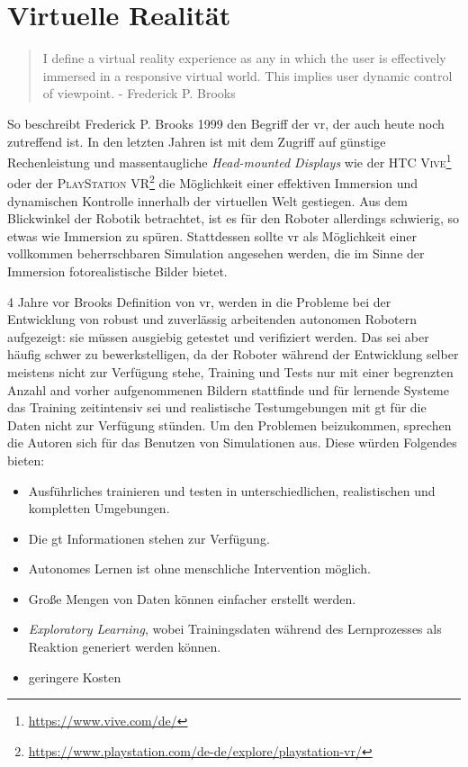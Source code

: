 \section{Virtuelle Realität}

\begin{quote}
\glqq I define a virtual reality experience as any in which the user is effectively immersed in a responsive virtual world. This implies user dynamic control of viewpoint.\grqq \newline
 \hfill - Frederick P. Brooks
\end{quote}
So beschreibt Frederick P. Brooks 1999 \cite{brooks} den Begriff der \gls{vr}, der auch heute noch zutreffend ist. In den letzten Jahren ist mit dem Zugriff auf günstige Rechenleistung und massentaugliche \textit{Head-mounted Displays} wie der \textsc{HTC Vive}\footnote{\url{https://www.vive.com/de/}} oder der \textsc{PlayStation VR}\footnote{\url{https://www.playstation.com/de-de/explore/playstation-vr/}} die Möglichkeit einer effektiven Immersion und dynamischen Kontrolle innerhalb der virtuellen Welt gestiegen. Aus dem Blickwinkel der Robotik betrachtet, ist es für den Roboter allerdings schwierig, so etwas wie Immersion zu spüren. Stattdessen sollte \gls{vr} als Möglichkeit einer vollkommen beherrschbaren Simulation angesehen werden, die im Sinne der Immersion fotorealistische Bilder bietet.  \par

4 Jahre vor Brooks Definition von \gls{vr}, werden in \cite{burger1995} die Probleme bei der Entwicklung von robust und zuverlässig arbeitenden autonomen Robotern aufgezeigt: sie müssen ausgiebig getestet und verifiziert werden. Das sei aber häufig schwer zu bewerkstelligen, da der Roboter während der Entwicklung selber meistens nicht zur Verfügung stehe, Training und Tests nur mit einer begrenzten Anzahl and vorher aufgenommenen Bildern stattfinde und für lernende Systeme das Training zeitintensiv sei und realistische Testumgebungen mit \gls{gt} für die Daten nicht zur Verfügung stünden. Um den Problemen beizukommen, sprechen die Autoren sich für das Benutzen von Simulationen aus. Diese würden Folgendes bieten: 
\begin{itemize}
	\item Ausführliches trainieren und testen in unterschiedlichen, realistischen und kompletten Umgebungen.
	\item Die \gls{gt} Informationen stehen zur Verfügung.
	\item Autonomes Lernen ist ohne menschliche Intervention möglich.
	\item Große Mengen von Daten können einfacher erstellt werden.
	\item \textit{Exploratory Learning}, wobei Trainingsdaten während des Lernprozesses als Reaktion generiert werden können. 
	\item geringere Kosten
\end{itemize}

